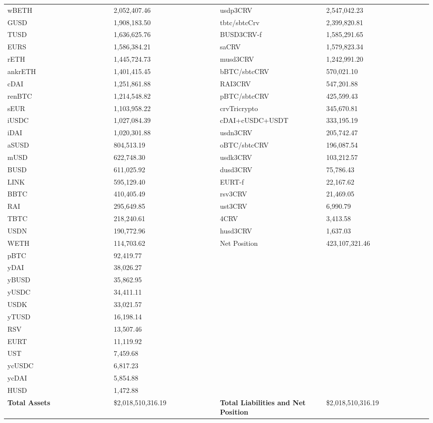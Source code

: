 \begin{longtable}{@{}p{0.25\linewidth}p{0.25\linewidth}p{0.25\linewidth}p{0.25\linewidth}@{}}
wBETH & 2,052,407.46 & usdp3CRV &2,547,042.23 \\
GUSD & 1,908,183.50 & tbtc/sbtcCrv &2,399,820.81 \\
TUSD & 1,636,625.76 & BUSD3CRV-f &1,585,291.65 \\
EURS & 1,586,384.21 & saCRV &1,579,823.34 \\
rETH & 1,445,724.73 & musd3CRV &1,242,991.20 \\
ankrETH & 1,401,415.45 & bBTC/sbtcCRV &570,021.10 \\
cDAI & 1,251,861.88 & RAI3CRV &547,201.88 \\
renBTC & 1,214,548.82 & pBTC/sbtcCRV &425,599.43 \\
sEUR & 1,103,958.22 & crvTricrypto &345,670.81 \\
iUSDC & 1,027,084.39 & cDAI+cUSDC+USDT &333,195.19 \\
iDAI & 1,020,301.88 & usdn3CRV &205,742.47 \\
aSUSD & 804,513.19 & oBTC/sbtcCRV &196,087.54 \\
mUSD & 622,748.30 & usdk3CRV &103,212.57 \\
BUSD & 611,025.92 & dusd3CRV &75,786.43 \\
LINK & 595,129.40 & EURT-f &22,167.62 \\
BBTC & 410,405.49 & rsv3CRV &21,469.05 \\
RAI & 295,649.85 & ust3CRV &6,990.79 \\
TBTC & 218,240.61 & 4CRV &3,413.58 \\
USDN & 190,772.96 & husd3CRV &1,637.03 \\
WETH & 114,703.62 & Net Position &423,107,321.46 \\
pBTC & 92,419.77 & & \\
yDAI & 38,026.27 & & \\
yBUSD & 35,862.95 & & \\
yUSDC & 34,411.11 & & \\
USDK & 33,021.57 & & \\
yTUSD & 16,198.14 & & \\
RSV & 13,507.46 & & \\
EURT & 11,119.92 & & \\
UST & 7,459.68 & & \\
ycUSDC & 6,817.23 & & \\
ycDAI & 5,854.88 & & \\
HUSD & 1,472.88 & & \\

\midrule

\textbf{Total Assets} & \$2,018,510,316.19 & \textbf{Total Liabilities and Net Position} & \$2,018,510,316.19 \\

\bottomrule

\end{longtable}
